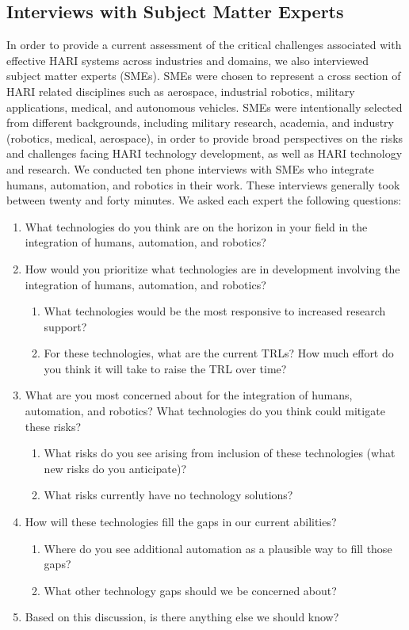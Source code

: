 \subsection{Interviews with Subject Matter Experts}
In order to provide a current assessment of the critical challenges associated with effective HARI systems across industries and domains, we also interviewed subject matter experts (SMEs).
SMEs were chosen to represent a cross section of HARI related disciplines such as aerospace, industrial robotics, military applications, medical, and autonomous vehicles.
SMEs were intentionally selected from different backgrounds, including military research, academia, and industry (robotics, medical, aerospace), in order to provide broad perspectives on the risks and challenges facing HARI technology development, as well as HARI technology and research.
We conducted ten phone interviews with SMEs who integrate humans, automation, and robotics in their work.
These interviews generally took between twenty and forty minutes.
We asked each expert the following questions:
\begin{enumerate}
    \item What technologies do you think are on the horizon in your field in the integration of humans, automation, and robotics?
    \item How would you prioritize what technologies are in development involving the integration of humans, automation, and robotics?
          \begin{enumerate}
              \item What technologies would be the most responsive to increased research support?
              \item For these technologies, what are the current TRLs? How much effort do you think it will take to raise the TRL over time?
          \end{enumerate}
    \item What are you most concerned about for the integration of humans, automation, and robotics? What technologies do you think could mitigate these risks?
          \begin{enumerate}
              \item What risks do you see arising from inclusion of these technologies (what new risks do you anticipate)?
              \item What risks currently have no technology solutions?
          \end{enumerate}
    \item How will these technologies fill the gaps in our current abilities?
          \begin{enumerate}
              \item Where do you see additional automation as a plausible way to fill those gaps?
              \item What other technology gaps should we be concerned about?
          \end{enumerate}
    \item Based on this discussion, is there anything else we should know?
\end{enumerate}

